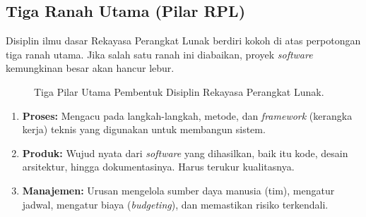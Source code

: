 \documentclass[12pt,a4paper]{article}
\begin{document}
\subsection{Tiga Ranah Utama (Pilar RPL)}
Disiplin ilmu dasar Rekayasa Perangkat Lunak berdiri kokoh di atas perpotongan tiga ranah utama. Jika salah satu ranah ini diabaikan, proyek \textit{software} kemungkinan besar akan hancur lebur.

\begin{figure}[h]
    \centering
    \caption{Tiga Pilar Utama Pembentuk Disiplin Rekayasa Perangkat Lunak.}
\end{figure}

\begin{enumerate}
    \item \textbf{Proses:} Mengacu pada langkah-langkah, metode, dan \textit{framework} (kerangka kerja) teknis yang digunakan untuk membangun sistem.
    \item \textbf{Produk:} Wujud nyata dari \textit{software} yang dihasilkan, baik itu kode, desain arsitektur, hingga dokumentasinya. Harus terukur kualitasnya.
    \item \textbf{Manajemen:} Urusan mengelola sumber daya manusia (tim), mengatur jadwal, mengatur biaya (\textit{budgeting}), dan memastikan risiko terkendali.
\end{enumerate}
\end{document}
